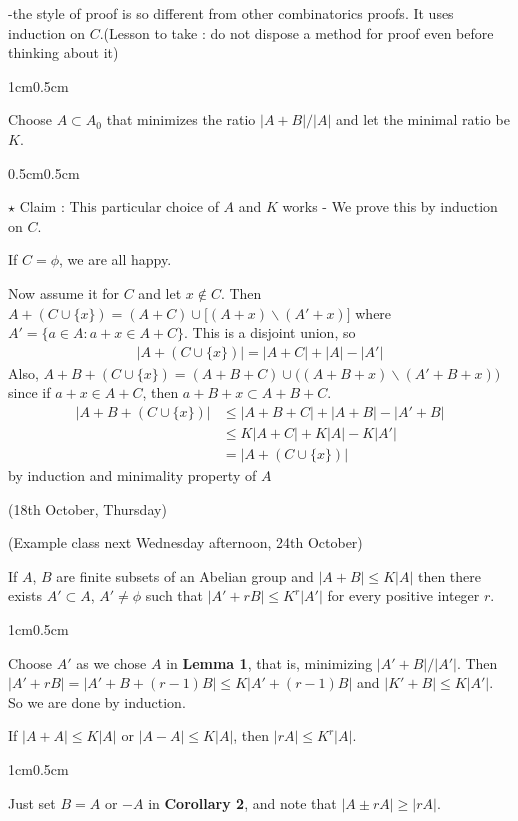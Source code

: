 \documentclass[10pt,a4paper]{report}
\newenvironment{proof}
{\begin{changemargin}{1cm}{0.5cm}
	}%
	{\end{changemargin}
}
\newenvironment{subproof}
{\begin{changemargin}{0.5cm}{0.5cm}
	}%
	{\end{changemargin}
}
\begin{document}
-the style of proof is so different from other combinatorics proofs. It uses induction on $C$.(Lesson to take : do not dispose a method for proof even before thinking about it)
\begin{proof}
\pf Choose $A \subset A_0$ that minimizes the ratio $|A+B|/|A|$ and let the minimal ratio be $K$.

\begin{subproof}
$\star$ Claim : This particular choice of $A$ and $K$ works - We prove this by induction on $C$.

\pf If $C=\phi$, we are all happy.

Now assume it for $C$ and let $x\notin C$. Then $A+(C \cup \{x\}) = (A+C) \cup \Big[ (A+x) \backslash (A'+x) \Big]$ where $A' = \{a\in A: a+x\in A+ C\}$. This is a disjoint union, so
\begin{align*}
|A+(C\cup \{x\})| = |A+C| + |A| - |A'|
\end{align*}
Also, $A+B + (C\cup \{x\}) = (A+B+C) \cup \big( (A+B+x) \backslash (A'+B+x)\big)$ since if $a+x\in A+C$, then $a+B+x \subset A+B+C$.
\begin{align*}
|A+B+(C\cup \{x \}) | &\leq |A+B+C| + |A+B| - |A'+B| \\
&\leq K|A+C| + K|A| - K|A'| \\
& = |A+(C\cup \{x\})|
\end{align*}
by induction and minimality property of $A$
\end{subproof}

\eop
\end{proof}
\s

\newday

(18th October, Thursday)
\s

(Example class next Wednesday afternoon, 24th October)
\s

 If $A$, $B$ are finite subsets of an Abelian group and $|A+ B|\leq K|A|$ then there exists $A' \subset A$, $A' \neq \phi$ such that $|A' + rB| \leq K^r|A'|$ for every positive integer $r$.
\begin{proof}
\pf Choose $A'$ as we chose $A$ in \textbf{Lemma 1}, that is, minimizing $|A'+B|/|A'|$. Then $|A' + rB| = |A'+B +(r-1)B| \leq K |A' + (r-1)B|$ and $|K' + B| \leq K|A'|$. So we are done by induction.

\eop
\end{proof}
\s

 If $|A+A| \leq K|A|$ or $|A-A| \leq K|A|$, then $|rA| \leq K^r |A|$.
\begin{proof}
\pf Just set $B= A$ or $-A$ in \textbf{Corollary 2}, and note that $|A \pm rA| \geq |rA|$.

\eop
\end{proof}
\s
\end{document}
